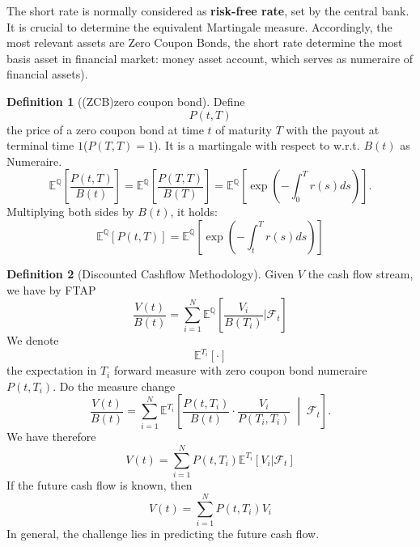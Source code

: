\documentclass[a4paper,11pt]{book}
\theoremstyle{definition}
\newtheorem{definition}{Definition}[section]
\theoremstyle{remark}
\begin{document}
The short rate is normally considered as \textbf{risk-free rate}, set by the central bank. It is crucial to determine the equivalent Martingale measure. Accordingly, the most relevant assets are Zero Coupon Bonds, the short rate determine the most basis asset in financial market: money asset account, which serves as numeraire of financial assets).


\begin{definition}[(ZCB)zero coupon bond]
Define 
\begin{equation}
	P(t, T) 
\end{equation}
the price of a zero coupon bond at time $t$ of maturity $T$ with the payout at terminal time $1$($P(T, T) = 1$). It is a martingale with respect to w.r.t. $B(t)$ as Numeraire. 
	\begin{equation*}
		\mathbb{E}^{\mathbb{Q}}[ \frac{P(t, T)}{B(t)}] = \mathbb{E}^\mathbb{Q}\left[\frac{P(T, T)}{B(T)}\right] = \mathbb{E}^\mathbb{Q} \left[\exp(-\int_0^T r(s)ds)\right].
	\end{equation*} 
	Multiplying both sides by $B(t)$, it holds:
	\begin{equation*}
		\mathbb{E}^\mathbb{Q} [P(t, T)] = \mathbb{E}^\mathbb{Q}\left[\exp(-\int_t^T r(s) ds)\right]
	\end{equation*}
\end{definition}
 

\begin{definition}[Discounted Cashflow Methodology]
Given $V$ the cash flow stream, we have by FTAP
	\begin{equation*}
		\frac{V(t)}{B(t)} = \sum_{i = 1}^N \mathbb{E}^{\mathbb{Q}}\left[\frac{V_i}{B(T_i)}|\mathcal{F}_t\right] 
	\end{equation*}
	We denote 
	\[
	\mathbb{E}^{T_i}[ \cdot ]
	\]
	the expectation in $T_i$ forward measure with zero coupon bond numeraire $P(t, T_i)$. Do the measure change
	\[
\frac{V(t)}{B(t)} = \sum_{i=1}^{N} \mathbb{E}^{T_i} \left[ \frac{P(t, T_i)}{B(t)} \cdot \frac{V_i}{P(T_i, T_i)} \;\middle|\; \mathcal{F}_t \right].
\]
We have therefore
	\begin{equation*}
		V(t) = \sum^N_{i = 1}P(t, T_i) \mathbb{E}^{T_i}[V_i|\mathcal{F}_t]
	\end{equation*}
	If the future cash flow is known, then
	\begin{equation*}
		V(t) = \sum^N_{i = 1}P(t, T_i) V_i
	\end{equation*}
	In general, the challenge lies in predicting the future cash flow.
\end{definition}
\end{document}
